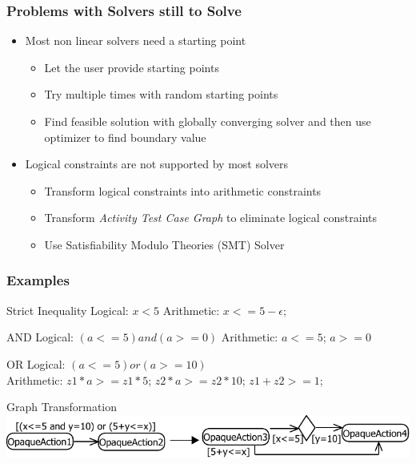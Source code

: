 \documentclass{beamer}
\begin{document}
\begin{frame}
\frametitle{Problems with Solvers still to Solve}
\begin{itemize}
\item Most non linear solvers need a starting point
\begin{itemize}
\item Let the user provide starting points
\item Try multiple times with random starting points
\item Find feasible solution with globally converging solver and then use optimizer to find boundary value
\end{itemize}
\item Logical constraints are not supported by most solvers
\begin{itemize}
\item Transform logical constraints into arithmetic constraints
\item Transform \emph{Activity Test Case Graph} to eliminate logical constraints
\item Use Satisfiability Modulo Theories (SMT) Solver
\end{itemize}
\end{itemize}
\end{frame}

\begin{frame}
\frametitle{Examples}
\begin{block}{Strict Inequality}
Logical: $x<5$ \hspace{1cm} Arithmetic: $x<=5-\epsilon$;
\end{block}
\begin{block}{AND}
Logical: $(a<=5) and (a>=0)$ \hspace{1cm} Arithmetic: $a<=5$; $a>=0$
\end{block}
\begin{block}{OR}
Logical: $(a<=5) or (a>=10)$ \\Arithmetic: $z1*a>=z1*5$; $ z2*a>=z2*10$; $z1+z2>=1$;
\end{block}
\begin{block}{Graph Transformation}
\includegraphics[width=\textwidth]{pics/transformLocigGuards.pdf}
\end{block}
\end{frame}
\end{document}
